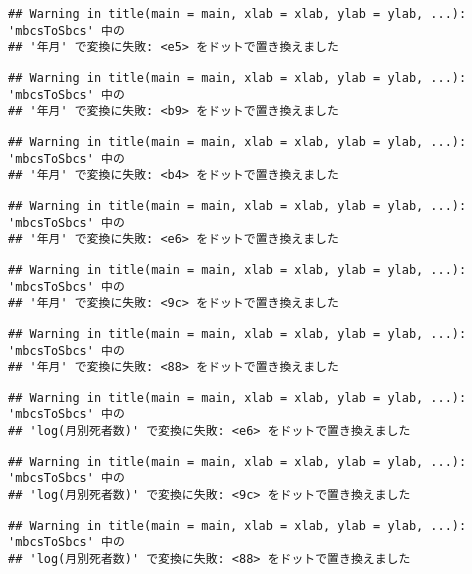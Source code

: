 \documentclass[]{article}
\begin{document}
\begin{verbatim}
## Warning in title(main = main, xlab = xlab, ylab = ylab, ...): 'mbcsToSbcs' 中の
## '年月' で変換に失敗: <e5> をドットで置き換えました
\end{verbatim}

\begin{verbatim}
## Warning in title(main = main, xlab = xlab, ylab = ylab, ...): 'mbcsToSbcs' 中の
## '年月' で変換に失敗: <b9> をドットで置き換えました
\end{verbatim}

\begin{verbatim}
## Warning in title(main = main, xlab = xlab, ylab = ylab, ...): 'mbcsToSbcs' 中の
## '年月' で変換に失敗: <b4> をドットで置き換えました
\end{verbatim}

\begin{verbatim}
## Warning in title(main = main, xlab = xlab, ylab = ylab, ...): 'mbcsToSbcs' 中の
## '年月' で変換に失敗: <e6> をドットで置き換えました
\end{verbatim}

\begin{verbatim}
## Warning in title(main = main, xlab = xlab, ylab = ylab, ...): 'mbcsToSbcs' 中の
## '年月' で変換に失敗: <9c> をドットで置き換えました
\end{verbatim}

\begin{verbatim}
## Warning in title(main = main, xlab = xlab, ylab = ylab, ...): 'mbcsToSbcs' 中の
## '年月' で変換に失敗: <88> をドットで置き換えました
\end{verbatim}

\begin{verbatim}
## Warning in title(main = main, xlab = xlab, ylab = ylab, ...): 'mbcsToSbcs' 中の
## 'log(月別死者数)' で変換に失敗: <e6> をドットで置き換えました
\end{verbatim}

\begin{verbatim}
## Warning in title(main = main, xlab = xlab, ylab = ylab, ...): 'mbcsToSbcs' 中の
## 'log(月別死者数)' で変換に失敗: <9c> をドットで置き換えました
\end{verbatim}

\begin{verbatim}
## Warning in title(main = main, xlab = xlab, ylab = ylab, ...): 'mbcsToSbcs' 中の
## 'log(月別死者数)' で変換に失敗: <88> をドットで置き換えました
\end{verbatim}
\end{document}
